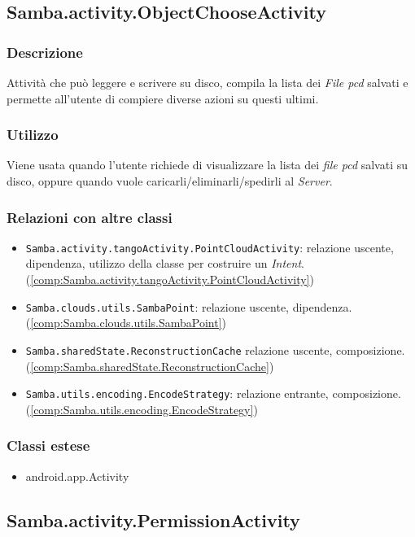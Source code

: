 \subsection{Samba.activity.ObjectChooseActivity}\label{comp:Samba.activity.ObjectChooseActivity}
\subsubsection{Descrizione}
Attività che può leggere e scrivere su disco, compila la lista dei \emph{File pcd} salvati e permette all'utente di compiere diverse azioni su questi ultimi.
\subsubsection{Utilizzo}
Viene usata quando l'utente richiede di visualizzare la lista dei \emph{file pcd} salvati su disco, oppure quando vuole caricarli/eliminarli/spedirli al \emph{Server}.
\subsubsection{Relazioni con altre classi}
\begin{itemize}
	\item \texttt{Samba.activity.tangoActivity.PointCloudActivity}: relazione uscente, dipendenza, utilizzo della classe per costruire un \emph{Intent}. (\ref{comp:Samba.activity.tangoActivity.PointCloudActivity})
	\item \texttt{Samba.clouds.utils.SambaPoint}: relazione uscente, dipendenza. (\ref{comp:Samba.clouds.utils.SambaPoint})
	\item \texttt{Samba.sharedState.ReconstructionCache} relazione uscente, composizione. (\ref{comp:Samba.sharedState.ReconstructionCache})
	\item \texttt{Samba.utils.encoding.EncodeStrategy}: relazione entrante, composizione. (\ref{comp:Samba.utils.encoding.EncodeStrategy})
\end{itemize}
\subsubsection{Classi estese}
\begin{itemize}
	\item android.app.Activity
\end{itemize}

\subsection{Samba.activity.PermissionActivity}\label{comp:Samba.activity.PermissionActivity}
